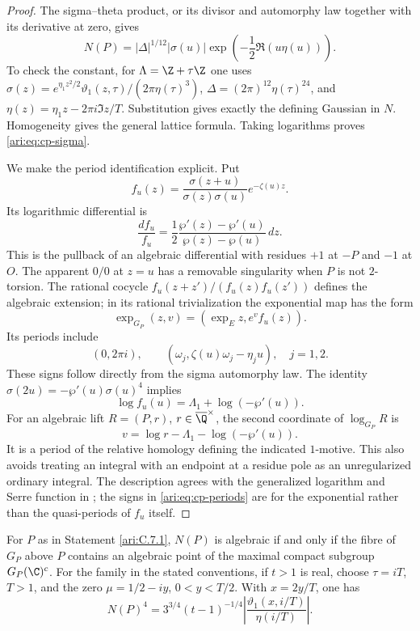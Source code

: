\begin{proof}
The sigma--theta product, or its divisor and automorphy law
together with its derivative at zero, gives
\begin{equation}\label{ari:eq:cp-klein}
 N(P)=|\Delta|^{1/12}|\sigma(u)|
                   \exp\!\left(-\frac12\Re(u\eta(u))\right).
\end{equation}
To check the constant, for $\Lambda=\Z+\tau\Z$ one uses
$\sigma(z)=e^{\eta_1z^2/2}\vartheta_1(z,\tau)/(2\pi\eta(\tau)^3)$,
$\Delta=(2\pi)^{12}\eta(\tau)^{24}$, and
$\eta(z)=\eta_1z-2\pi i\Im z/T$. Substitution gives exactly
the defining Gaussian in $N$. Homogeneity gives the general
lattice formula. Taking logarithms proves \eqref{ari:eq:cp-sigma}.

We make the period identification explicit. Put
\[
 f_u(z)=\frac{\sigma(z+u)}{\sigma(z)\sigma(u)}e^{-\zeta(u)z}.
\]
Its logarithmic differential is
\[
 \frac{df_u}{f_u}
 =\frac12\frac{\wp'(z)-\wp'(u)}{\wp(z)-\wp(u)}\,dz.
\]
This is the pullback of an algebraic differential with residues
$+1$ at $-P$ and $-1$ at $O$. The apparent $0/0$ at $z=u$
has a removable singularity when $P$ is not $2$-torsion.
The rational cocycle $f_u(z+z')/(f_u(z)f_u(z'))$ defines
the algebraic extension; in its rational trivialization the
exponential map has the form
\[
 \exp_{G_P}(z,v)=(\exp_E z,e^v f_u(z)).
\]
Its periods include
\begin{equation}\label{ari:eq:cp-periods}
 (0,2\pi i),\qquad
 (\omega_j,\zeta(u)\omega_j-\eta_j u),\quad j=1,2.
\end{equation}
These signs follow directly from the sigma automorphy law.
The identity
$\sigma(2u)=-\wp'(u)\sigma(u)^4$ implies
\[
 \log f_u(u)=\Lambda_1+\log(-\wp'(u)).
\]
For an algebraic lift $R=(P,r)$, $r\in\overline\Q^{\times}$,
the second coordinate of $\log_{G_P}R$ is
\begin{equation}\label{ari:eq:cp-v}
 v=\log r-\Lambda_1-\log(-\wp'(u)).
\end{equation}
It is a period of the relative homology defining the indicated
$1$-motive. This also avoids treating an integral with an endpoint
at a residue pole as an unregularized ordinary integral.
The description agrees with the generalized logarithm and
Serre function in \citet[Definitions 2.3--2.4 and
Section 6]{bertolin2022}; the signs in
\eqref{ari:eq:cp-periods} are for the exponential rather than the
quasi-periods of $f_u$ itself.
\end{proof}

\begin{proposition}\label{ari:C.7.2}
For $P$ as in Statement \ref{ari:C.7.1}, $N(P)$ is algebraic if and only
if the fibre of $G_P$ above $P$ contains an algebraic point of
the maximal compact subgroup $G_P(\C)^c$.
For the family in the stated conventions, if $t>1$ is real, choose
$\tau=iT$, $T>1$, and the zero $\mu=1/2-iy$, $0<y<T/2$.
With $x=2y/T$, one has
\[
 N(P)^4=3^{3/4}(t-1)^{-1/4}
       \left|\frac{\vartheta_1(x,i/T)}{\eta(i/T)}\right|.
\]
\end{proposition}

